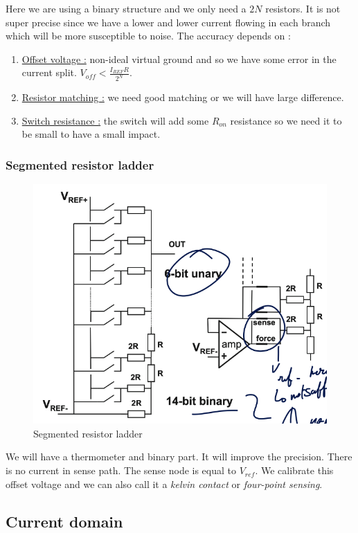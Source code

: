 \documentclass{report}
\begin{document}
Here we are using a binary structure and we only need a $2N$ resistors. It is not super precise since we have a lower and lower current flowing in each branch which will be more susceptible to noise. The accuracy depends on :

\begin{enumerate}
    \item \underline{Offset voltage :} non-ideal virtual ground and so we have some error in the current split. $V_{off} < \frac{I_{REF} R}{2^N}$.
    \item \underline{Resistor matching :} we need good matching or we will have large difference.
    \item \underline{Switch resistance :} the switch will add some $R_{on}$ resistance so we need it to be small to have a small impact.
\end{enumerate}

\subsubsection{Segmented resistor ladder}

\begin{figure}[H]
    \centering
    \includegraphics[width=0.75\linewidth]{img/segmented_r_ladder.png}
    \caption{Segmented resistor ladder}
    \label{fig:segmented-resistor-label}
\end{figure}

We will have a thermometer and binary part. It will improve the precision. There is no current in sense path. The sense node is equal to $V_{ref}$. We calibrate this offset voltage and we can also call it a \textit{kelvin contact} or \textit{four-point sensing}.

\subsection{Current domain}
\end{document}
